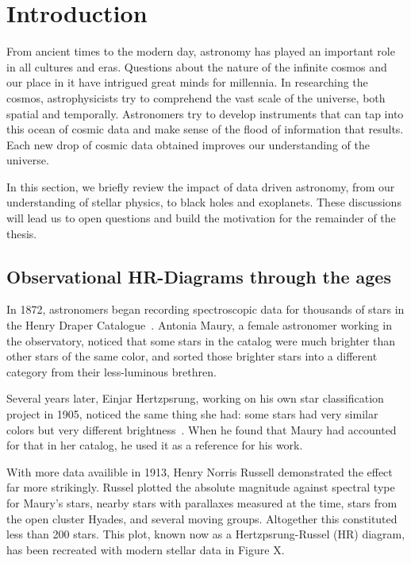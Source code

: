 \chapter{Introduction}
\label{cp.intro}


From ancient times to the modern day, astronomy has played an important role in all cultures and eras.
Questions about the nature of the infinite cosmos and our place in it have intrigued great minds for millennia.
In researching the cosmos, astrophysicists try to comprehend the vast scale of the universe, both spatial and temporally.
Astronomers try to develop instruments that can tap into this ocean of cosmic data and make sense of the flood of information that results.
Each new drop of cosmic data obtained improves our understanding of the universe.

In this section, we briefly review the impact of data driven astronomy, from our understanding of stellar physics, to black holes and exoplanets. 
These discussions will lead us to open questions and build the motivation for the remainder of the thesis.


\section{Observational HR-Diagrams through the ages}

In 1872, astronomers began recording spectroscopic data for thousands of stars in the Henry Draper Catalogue~\citeme.
Antonia Maury, a female astronomer working in the observatory, noticed that some stars in the catalog were much brighter than other stars of the same color, and sorted those brighter stars into a different category from their less-luminous brethren.

Several years later, Einjar Hertzpsrung, working on his own star classification project in 1905, noticed the same thing she had: some stars had very similar colors but very different brightness~\citeme.
When he found that Maury had accounted for that in her catalog, he used it as a reference for his work.

With more data availible in 1913, Henry Norris Russell demonstrated the effect far more strikingly. 
Russel plotted the absolute magnitude against spectral type for Maury's stars, nearby stars with parallaxes measured at the time, stars from the open cluster Hyades, and several moving groups.
Altogether this constituted less than 200 stars. 
This plot, known now as a Hertzpsrung-Russel (HR) diagram, has been recreated with modern stellar data in Figure X.


